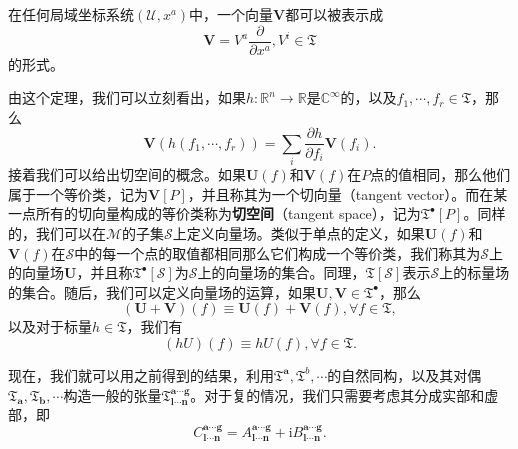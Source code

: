 \begin{them}[label={them:form of vector field}]{}
	在任何局域坐标系统$(\mathcal{U} ,x^{a} )$中，一个向量$\boldsymbol{V}$都可以被表示成
	\begin{equation*}
		\boldsymbol{V} =V^{a}\frac{\partial }{\partial x^{a}} ,V^{i} \in \mathfrak{T}
	\end{equation*}
	的形式。
\end{them}

由这个定理，我们可以立刻看出，如果$h:\mathbb{R}^{n}\rightarrow \mathbb{R}$是$\mathbb{C}^{\infty }$的，以及$f_{1} ,\cdots ,f_{r} \in \mathfrak{T}$，那么
\begin{equation*}
	\boldsymbol{V} (h( f_{1} ,\cdots ,f_{r}) )=\sum _{i}\frac{\partial h}{\partial f_{i}}\boldsymbol{V}( f_{i}) .
\end{equation*}
接着我们可以给出切空间的概念。如果$\boldsymbol{U}( f)$和$\boldsymbol{V}( f)$在$P$点的值相同，那么他们属于一个等价类，记为$\boldsymbol{V}[ P]$，并且称其为一个切向量（tangent vector）。而在某一点所有的切向量构成的等价类称为\textbf{切空间}（tangent space），记为$\mathfrak{T}^{\bullet }[ P]$。同样的，我们可以在$\mathcal{M}$的子集$\mathcal{S}$上定义向量场。类似于单点的定义，如果$\boldsymbol{U}( f)$和$\boldsymbol{V}( f)$在$\mathcal{S}$中的每一个点的取值都相同那么它们构成一个等价类，我们称其为$\mathcal{S}$上的向量场$\boldsymbol{U}$，并且称$\mathfrak{T}^{\bullet }[\mathcal{S}]$为$\mathcal{S}$上的向量场的集合。同理，$\mathfrak{T}[\mathcal{S}]$表示$\mathcal{S}$上的标量场的集合。随后，我们可以定义向量场的运算，如果$\boldsymbol{U} ,\boldsymbol{V} \in \mathfrak{T}^{\bullet }$，那么
\begin{equation*}
	(\boldsymbol{U} +\boldsymbol{V} )( f) \equiv \boldsymbol{U}( f) +\boldsymbol{V}( f) ,\forall f\in \mathfrak{T} ,
\end{equation*}
以及对于标量$h\in \mathfrak{T}$，我们有
\begin{equation*}
	( hU)( f) \equiv hU( f) ,\forall f\in \mathfrak{T} .
\end{equation*}


现在，我们就可以用之前得到的结果，利用$\mathfrak{T}^{\boldsymbol{a}} ,\mathfrak{T}^{b} ,\cdots $的自然同构，以及其对偶$\mathfrak{T}_{\boldsymbol{a}} ,\mathfrak{T}_{\boldsymbol{b}} ,\cdots $构造一般的张量$\mathfrak{T}_{\boldsymbol{l} \cdots \boldsymbol{n}}^{\boldsymbol{a} \cdots \boldsymbol{g}}$。对于复的情况，我们只需要考虑其分成实部和虚部，即
\begin{equation*}
	C_{\boldsymbol{l} \cdots \boldsymbol{n}}^{\boldsymbol{a} \cdots \boldsymbol{g}} =A_{\boldsymbol{l} \cdots \boldsymbol{n}}^{\boldsymbol{a} \cdots \boldsymbol{g}} +\mathrm{i} B_{\boldsymbol{l} \cdots \boldsymbol{n}}^{\boldsymbol{a} \cdots \boldsymbol{g}} .
\end{equation*}


